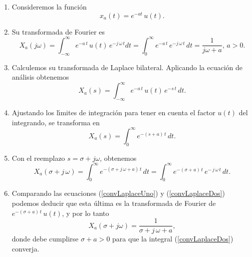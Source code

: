 \begin{enumerate}

\item Consideremos la funci\'{o}n 
\begin{equation}
        x_{a}\left( t\right) =
                e^{-at} \, u\left( t\right) . \label{convLaplaceUno}
\end{equation}

\item Su transformada de Fourier es
\begin{equation}
        X_{a}(j \omega) = 
                \int_{-\infty}^{\infty} e^{-a \, t} \, u(t) \, e^{-j
                  \, \omega \, t} dt =
                \int_{0}^{\infty} e^{-a \, t} \, e^{-j \, \omega \, t} \, dt =
                \frac{1}{j \omega + a}, \, a > 0.
\end{equation}

\item Calculemos su transformada de Laplace bilateral. Aplicando la ecuaci\'{o}n de an\'{a}lisis obtenemos
\begin{equation}
        X_{a}\left( s\right) =
                \int_{-\infty }^{\infty } e^{-a \, t} \, u\left( t\right)
                \, e^{-s \, t} \, dt.
\end{equation}

\item Ajustando los l\'{\i}mites de integraci\'{o}n para tener en cuenta el factor $u(t)$ del 
integrando, se transforma en
\begin{equation}
        X_{a}\left( s\right) =
                \int_{0}^{\infty } e^{-\left( s + a\right) \, t} \, dt.
\end{equation}

\item Con el reemplazo $s = \sigma + j \omega$, obtenemos
\begin{equation}
        X_{a}\left( \sigma + j \, \omega\right) =
          \int_{0}^{\infty }e^{-\left( \sigma + j \, \omega + a\right)
            \, t} \, dt = 
          \int_{0}^{\infty }e^{-\left( \sigma + a \right) \, t} \,
             e^{- \, j \, \omega \, t} \, dt. \label{convLaplaceDos}
\end{equation}

\item Comparando las ecuaciones (\ref{convLaplaceUno}) y
  (\ref{convLaplaceDos}) podemos deducir que esta \'{u}ltima es la
  transformada de Fourier de $e^{-(\sigma +a) \, t} \, u(t)$, y por lo tanto
\begin{equation}
        X_{a}(\sigma + j \omega) = 
         \frac{1}{\sigma + j \, \omega + a}, 
\end{equation}
donde debe cumplirse $\sigma + a > 0$ para que la integral (\ref{convLaplaceDos}) converja.


\end{enumerate}

